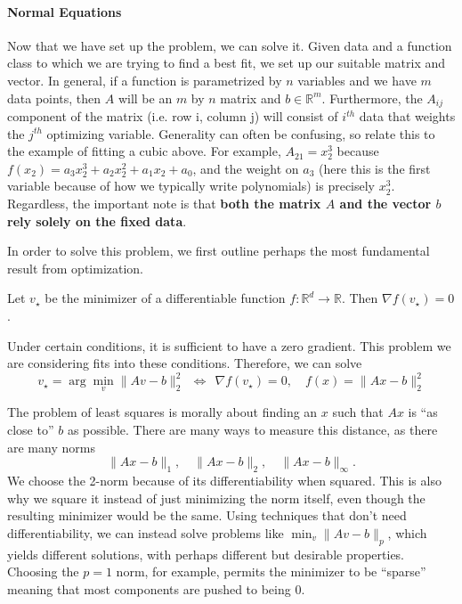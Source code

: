 \documentclass[11pt]{article}
\numberwithin{equation}{section}
\newcommand{\R}{\mathbb{R}}
\begin{document}
\paragraph{Normal Equations}
Now that we have set up the problem, we can solve it. Given data and a function class to which we are trying to find a best fit, we set up our suitable matrix and vector. In general, if a function is parametrized by $n$ variables and we have $m$ data points, then $A$ will be an $m$ by $n$ matrix and $b \in \R^m$. Furthermore, the $A_{ij}$ component of the matrix (i.e. row i, column j) will consist of $i^{th}$ data that weights the $j^{th}$ optimizing variable. Generality can often be confusing, so relate this to the example of fitting a cubic above. For example, $A_{21}=x_2^3$ because $f(x_2) = a_3x_2^3+ a_2x_2^2+a_1x_2+a_0$, and the weight on $a_3$ (here this is the first variable because of how we typically write polynomials) is precisely $x_2^3$. Regardless, the important note is that \textbf{both the matrix $A$ and the vector $b$ rely solely on the fixed data}.


In order to solve this problem, we first outline perhaps the most fundamental result from optimization.
\begin{theorem}{}{}
    Let $v_\star$ be the minimizer of a differentiable function $f : \R^d \to \R$. Then $\nabla f(v_\star) = 0$.  
\end{theorem}
Under certain conditions, it is sufficient to have a zero gradient. This problem we are considering fits into these conditions. Therefore, we can solve $$v_\star = \arg \min_v \|Av-b\|_2^2 \ \ \Longleftrightarrow  \ \ \nabla f(v_\star) = 0, \quad f(x) = \|Ax-b\|_2^2$$

\begin{remark}{}{}
    The problem of least squares is morally about finding an $x$ such that $Ax$ is ``as close to'' $b$ as possible. There are many ways to measure this distance, as there are many norms $$\|Ax-b\|_1, \quad \|Ax-b\|_2, \quad \|Ax-b\|_\infty.$$
    We choose the 2-norm because of its differentiability when squared. This is also why we square it instead of just minimizing the norm itself, even though the resulting minimizer would be the same. Using techniques that don't need differentiability, we can instead solve problems like $\min_v \|Av-b\|_p$, which yields different solutions, with perhaps different but desirable properties. Choosing the $p=1$ norm, for example, permits the minimizer to be ``sparse'' meaning that most components are pushed to being $0$.
\end{remark}
\end{document}
